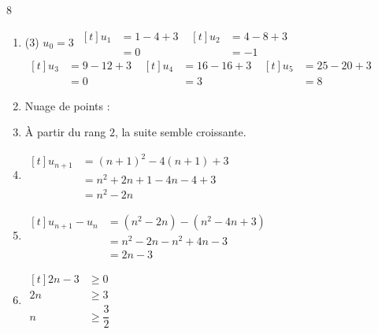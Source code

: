 \documentclass[10pt,a4paper]{article}
\begin{document}
\begin{corr}[Guidé]{8}
\begin{enumerate}[leftmargin=*]
    \item \begin{tasks}[after-item-skip=0.2cm](3)
        \task \(u_0=3\)
        \task \(\begin{aligned}[t] u_1&=1-4+3\\ &=0\end{aligned}\)
        \task \(\begin{aligned}[t] u_2&=4-8+3\\ &=-1\end{aligned}\)
        \task \(\begin{aligned}[t] u_3&=9-12+3\\ &=0\end{aligned}\)
        \task \(\begin{aligned}[t] u_4&=16-16+3\\ &=3\end{aligned}\)
        \task \(\begin{aligned}[t] u_5&=25-20+3\\ &=8\end{aligned}\)
    \end{tasks}
    \item Nuage de points :
    \begin{center}
    \end{center}
    \item À partir du rang \(2\), la suite semble croissante.
    \item \(\begin{aligned}[t] u_{n+1}&=(n+1)^2-4(n+1)+3\\ &=n^2+2n+1-4n-4+3\\ &=n^2-2n\end{aligned}\)
    \item \(\begin{aligned}[t] u_{n+1}-u_n&=(n^2-2n)-(n^2-4n+3)\\ &=n^2-2n-n^2+4n-3\\ &=2n-3\end{aligned}\)
    \item \(\begin{aligned}[t] 2n-3&\geq 0\\ 2n&\geq 3\\ n&\geq \dfrac{3}{2}\end{aligned}\)


\end{enumerate}
\end{corr}
\end{document}
